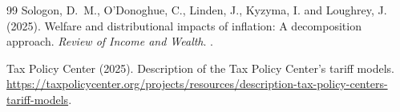 \begin{thebibliography}{99}
Sologon, D.~M., O'Donoghue, C., Linden, J., Kyzyma, I. and Loughrey, J. (2025).
\newblock Welfare and distributional impacts of inflation: A decomposition approach.
\newblock \emph{Review of Income and Wealth}. .

Tax Policy Center (2025).
\newblock Description of the Tax Policy Center's tariff models.
\newblock \url{https://taxpolicycenter.org/projects/resources/description-tax-policy-centers-tariff-models}.

\end{thebibliography}
\endgroup
